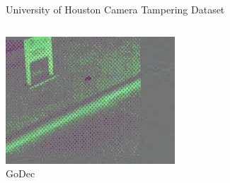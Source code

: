 \documentclass[10pt]{beamer}
\begin{document}
\begin{frame}{University of Houston Camera Tampering Dataset}
\begin{columns}
{            \includegraphics[width = \textwidth]{figures/rsvd_uhctd/GoDecfg_frame75.jpg}\\
            {\centering GoDec}
        }
\end{columns}
\end{frame}
\end{document}
